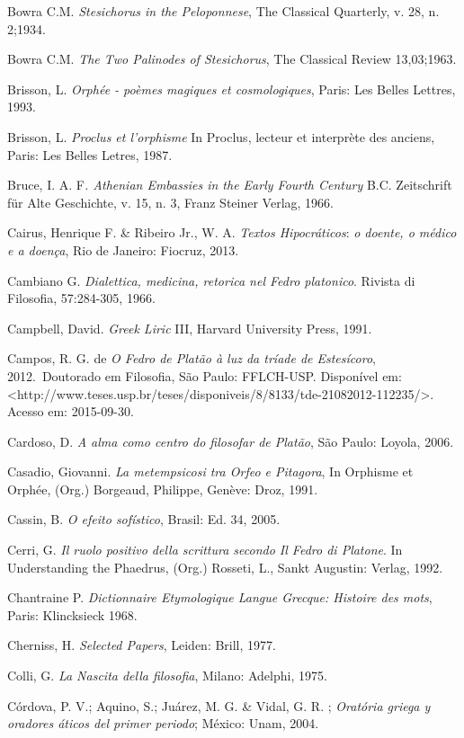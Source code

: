 Bowra C.M. \emph{Stesichorus in the Peloponnese}, The Classical
Quarterly, v. 28, n. 2;1934.

Bowra C.M. \emph{The Two Palinodes of Stesichorus}, The Classical Review
13,03;1963.

Brisson, L. \emph{Orphée - poèmes magiques et cosmologiques}, Paris: Les
Belles Lettres, 1993.

Brisson, L. \emph{Proclus et l'orphisme} In Proclus, lecteur et
interprète des anciens, Paris: Les Belles Letres, 1987.

Bruce, I. A. F\emph{. Athenian Embassies in the Early Fourth Century}
B.C. Zeitschrift für Alte Geschichte, v. 15, n. 3, Franz Steiner Verlag,
1966.

Cairus, Henrique F. \& Ribeiro Jr., W. A. \emph{Textos Hipocráticos}:
\emph{o doente, o médico e a doença}, Rio de Janeiro: Fiocruz, 2013.

Cambiano G. \emph{Dialettica, medicina, retorica nel Fedro platonico}.
Rivista di Filosofia, 57:284-305, 1966.

Campbell, David. \emph{Greek Liric} III, Harvard University Press, 1991.

Campos, R. G. de \emph{O Fedro de Platão à luz da tríade de Estesícoro},
2012.~Doutorado em Filosofia, São Paulo: FFLCH-USP. Disponível em:
\textless{}http://www.teses.usp.br/teses/disponiveis/8/8133/tde-21082012-112235/\textgreater{}.
Acesso em: 2015-09-30.

Cardoso, D. \emph{A alma como centro do filosofar de Platão}, São Paulo:
Loyola, 2006.

Casadio, Giovanni. \emph{La metempsicosi tra Orfeo e Pitagora}, In
Orphisme et Orphée, (Org.) Borgeaud, Philippe, Genève: Droz, 1991.

Cassin, B. \emph{O efeito sofístico}, Brasil: Ed. 34, 2005.

Cerri, G. \emph{Il ruolo positivo della scrittura secondo Il Fedro di
Platone}. In Understanding the Phaedrus, (Org.) Rosseti, L., Sankt
Augustin: Verlag, 1992.

Chantraine P. \emph{Dictionnaire Etymologique Langue Grecque: Histoire
des mots}, Paris: Klincksieck 1968.

Cherniss, H. \emph{Selected Papers}, Leiden: Brill, 1977.

Colli, G. \emph{La Nascita della filosofia}, Milano: Adelphi, 1975.

Córdova, P. V.; Aquino, S.; Juárez, M. G. \& Vidal, G. R. ;
\emph{Oratória griega y oradores áticos del primer periodo}; México:
Unam, 2004.

